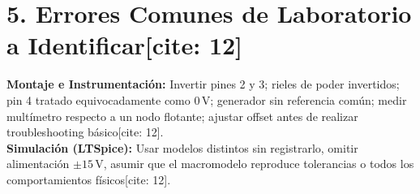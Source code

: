 \documentclass[11pt, a4paper]{article}
\begin{document}
\section*{5. Errores Comunes de Laboratorio a Identificar[cite: 12]}
\textbf{Montaje e Instrumentación:} Invertir pines 2 y 3; rieles de poder invertidos; pin 4 tratado equivocadamente como $0\,\text{V}$; generador sin referencia común; medir multímetro respecto a un nodo flotante; ajustar offset antes de realizar troubleshooting básico[cite: 12]. \\
\textbf{Simulación (LTSpice):} Usar modelos distintos sin registrarlo, omitir alimentación $\pm15\,\text{V}$, asumir que el macromodelo reproduce tolerancias o todos los comportamientos físicos[cite: 12].
\end{document}
